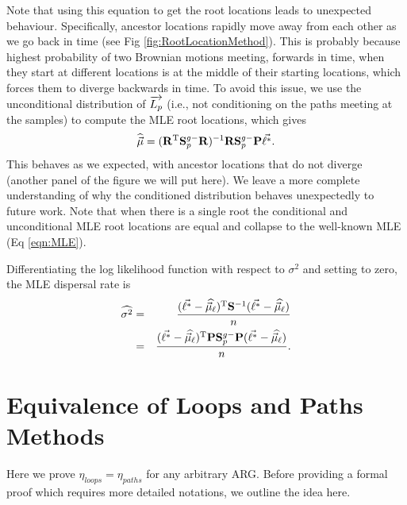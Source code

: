 Note that using this equation to get the root locations leads to unexpected behaviour. Specifically, ancestor locations rapidly move away from each other as we go back in time (see Fig \ref{fig:RootLocationMethod}). This is probably because highest probability of two Brownian motions meeting, forwards in time, when they start at different locations is at the middle of their starting locations, which forces them to diverge backwards in time. To avoid this issue, we use the unconditional distribution of $\overrightarrow{L_p}$ (i.e., not conditioning on the paths meeting at the samples) to compute the MLE root locations, which gives 
\begin{eqnarray*} 
    \widehat{\vec{\mu}} = (\mathbf{R}^\text{T}\mathbf{S}_p^{g-}\mathbf{R})^{-1} \mathbf{R}\mathbf{S}_p^{g-}\mathbf{P}\vec{\ell^*}.
\end{eqnarray*}
This behaves as we expected, with ancestor locations that do not diverge (another panel of the figure we will put here). We leave a more complete understanding of why the conditioned distribution behaves unexpectedly to future work. Note that when there is a single root the conditional and unconditional MLE root locations are equal and collapse to the well-known MLE (Eq \ref{eqn:MLE}).

Differentiating the log likelihood function with respect to $\sigma^2$ and setting to zero, the MLE dispersal rate is
\begin{eqnarray}
    \widehat{\sigma^2} &=& \displaystyle \frac{(\vec{\ell^*} - \widehat{\vec{\mu}_\ell})^{\text{T}} \mathbf{S}^{-1}(\vec{\ell^*}-\widehat{\vec{\mu}_\ell})}{n} \\ 
    &=& \displaystyle \frac{(\vec{\ell^*} - \widehat{\vec{\mu}_\ell})^{\text{T}} \mathbf{P}\mathbf{S}_p^{g-}\mathbf{P} (\vec{\ell^*}-\widehat{\vec{\mu}_\ell})}{n}.
\end{eqnarray}


\section{Equivalence of Loops and Paths Methods}
\label{appendix:Equivalence}
Here we prove $\eta_{loops} = \eta_{paths}$ for any arbitrary ARG. Before providing a formal proof which requires more detailed notations, we outline the idea here. 

